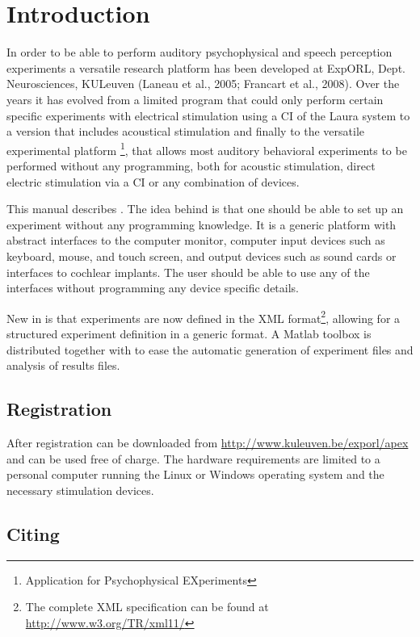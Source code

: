 \chapter{Introduction}

In order to be able to perform auditory psychophysical and speech
perception experiments a versatile research platform has been
developed at ExpORL, Dept. Neurosciences, KULeuven (Laneau et al.,
2005; Francart et al., 2008). Over the years it has evolved from a
limited program that could only perform certain specific
experiments with electrical stimulation using a CI of the Laura
system to a version that includes acoustical stimulation and
finally to the versatile experimental platform \apex
\footnote{Application for Psychophysical EXperiments}, that allows
most auditory behavioral experiments to be performed without any
programming, both for acoustic stimulation, direct electric
stimulation via a CI or any combination of devices.

This manual describes \apex. The idea behind \apex is that one
should be able to set up an experiment without any programming
knowledge. It is a generic platform with abstract interfaces to
the computer monitor, computer input devices such as keyboard,
mouse, and touch screen, and output devices such as sound cards or
interfaces to cochlear implants. The user should be able to use
any of the interfaces without programming any device specific
details.

New in \apex is that experiments are now defined in the {XML}
format\footnote{The complete XML specification can be found at
\url{http://www.w3.org/TR/xml11/}}, allowing for a structured
experiment definition in a generic format. A Matlab toolbox is
distributed together with \apex to ease the automatic generation
of experiment files and analysis of results files.

\section{Registration}

After registration \apex can be downloaded from
\url{http://www.kuleuven.be/exporl/apex} and can be used free of
charge. The hardware requirements are limited to a personal
computer running the Linux or Windows operating system and the
necessary stimulation devices.

\section {Citing}

